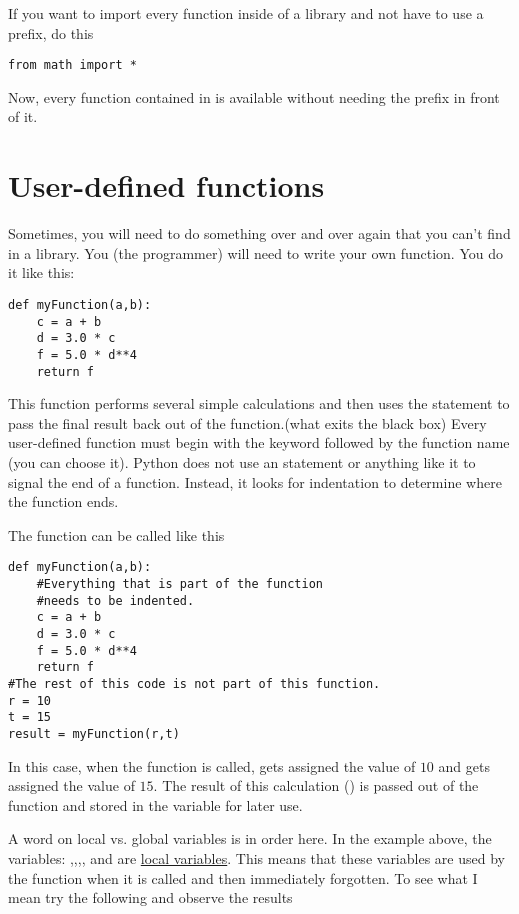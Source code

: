 If you want to import every function inside of a library and not have to use a prefix, do this
\begin{Verbatim}
from math import *
\end{Verbatim}
Now, every function contained in  is available without
needing the  prefix in front of it.

\section{User-defined functions}
Sometimes, you will need to do something over and over again that you
can't find in a library.  You (the programmer) will need to write your
own function. You do it like this:
\begin{Verbatim}
def myFunction(a,b):
    c = a + b
    d = 3.0 * c
    f = 5.0 * d**4
    return f
\end{Verbatim}
This function performs several simple calculations and then uses the
 statement to pass the final result back out of the
function.(what exits the black box) Every user-defined function must
begin with the keyword  followed by the function name (you
can choose it). Python does not use an  statement or
anything like it to signal the end of a function.  Instead, it looks
for indentation to determine where the function ends.


The function can be called like this
\begin{Verbatim}
def myFunction(a,b):
    #Everything that is part of the function
    #needs to be indented.
    c = a + b
    d = 3.0 * c
    f = 5.0 * d**4
    return f
#The rest of this code is not part of this function.
r = 10
t = 15
result = myFunction(r,t)
\end{Verbatim}
In this case, when the function is called,  gets assigned the
value of $10$ and  gets assigned the value of $15$.  The
result of this calculation () is passed out of the function
and stored in the variable  for later use.


A word on local vs. global variables is in order here.  In the example
above, the variables: ,,,, and
 are \ul{local variables}.  This means that these variables
are used by the function when it is called and then immediately
forgotten.  To see what I mean try the following and observe the
results

